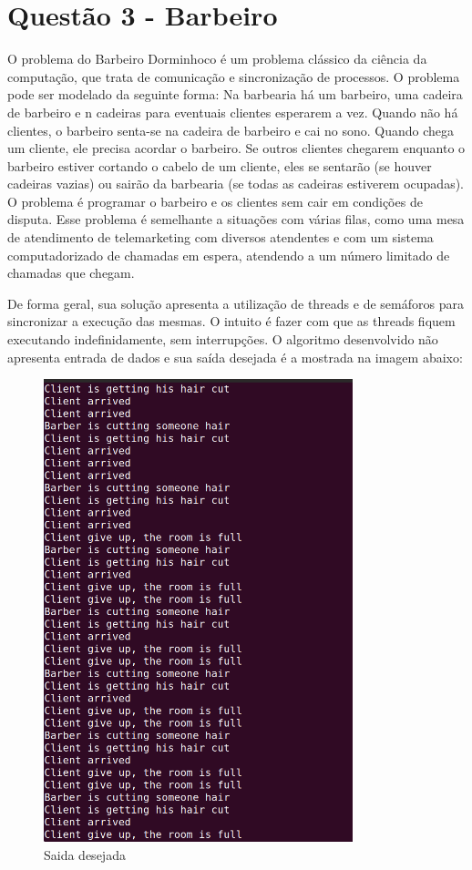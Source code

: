 \documentclass[12pt]{report}
\begin{document}
{\section{Questão 3 - Barbeiro}
O problema do Barbeiro Dorminhoco é um problema clássico da ciência da computação, que trata de comunicação e sincronização de processos. O problema pode ser modelado da seguinte forma: Na barbearia há um barbeiro, uma cadeira de barbeiro e n cadeiras para eventuais clientes esperarem a vez. Quando não há clientes, o barbeiro senta-se na cadeira de barbeiro e cai no sono. Quando chega um cliente, ele precisa acordar o barbeiro. Se outros clientes chegarem enquanto o barbeiro estiver cortando o cabelo de um cliente, eles se sentarão (se houver cadeiras vazias) ou sairão da barbearia (se todas as cadeiras estiverem ocupadas). O problema é programar o barbeiro e os clientes sem cair em condições de disputa. Esse problema é semelhante a situações com várias filas, como uma mesa de atendimento de telemarketing com diversos atendentes e com um sistema computadorizado de chamadas em espera, atendendo a um número limitado de chamadas que chegam.

De forma geral, sua solução apresenta a utilização de threads e de semáforos para sincronizar a execução das mesmas. O intuito é fazer com que as threads fiquem executando indefinidamente, sem interrupções. O algoritmo desenvolvido não apresenta entrada de dados e sua saída desejada é a mostrada na imagem abaixo:

\begin{figure}[!ht]
	\centering
	\includegraphics[width=0.8\textwidth]{Barbeiro.png}
	\caption{Saida desejada}
	\centering
	\label{label:file_name}
\end{figure}

}
\end{document}
